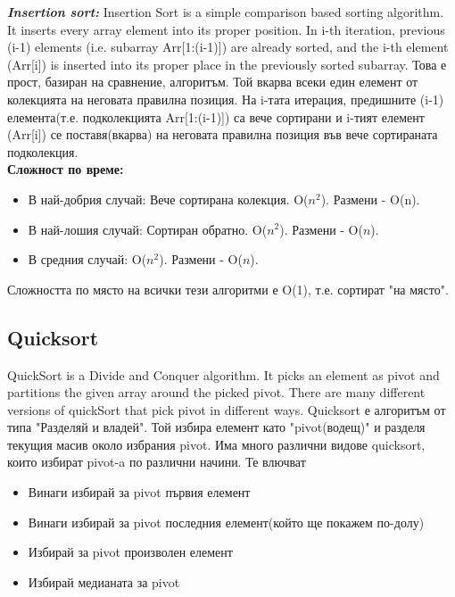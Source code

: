 \documentclass[11pt]{article} %
\newcommand{\italicBold}[1]{\textbf{\emph{#1}}}
\begin{document}
\italicBold{Insertion sort: }
Insertion Sort is a simple comparison based sorting algorithm. It inserts every array element into its proper position. In i-th iteration, previous (i-1) elements (i.e. subarray Arr[1:(i-1)]) are already sorted, and the i-th element (Arr[i]) is inserted into its proper place in the previously sorted subarray.
Това е прост, базиран на сравнение, алгоритъм. Той вкарва всеки един елемент от колекцията на неговата правилна позиция. На i-тата итерация, предишните (i-1) елемента(т.е. подколекцията Arr[1:(i-1)]) са вече сортирани и i-тият елемент (Arr[i]) се поставя(вкарва) на неговата правилна позиция във вече сортираната подколекция.
\\
\textbf{Сложност по време: }
\begin{itemize}[noitemsep]
	\item В най-добрия случай: Вече сортирана колекция. O($n^2$). Размени - O(n).
	\item В най-лошия случай: Сортиран обратно. O($n^{2}$). Размени - O($n$).
	\item В средния случай: O($n^{2}$). Размени - O($n$).\\\par
\end{itemize}

Сложността по място на всички тези алгоритми е O(1), т.е. сортират "на място".

 \subsection{Quicksort}
QuickSort is a Divide and Conquer algorithm. It picks an element as pivot and partitions the given array around the picked pivot. There are many different versions of quickSort that pick pivot in different ways.
Quicksort е алгоритъм от типа "Разделяй и владей". Той избира елемент като "pivot(водещ)" и разделя текущия масив около избрания pivot. Има много различни видове quicksort, които избират pivot-a по различни начини. Те влючват
\begin{itemize}[noitemsep]
	\item Винаги избирай за pivot първия елемент
	\item Винаги избирай за pivot последния елемент(който ще покажем по-долу)
	\item Избирай за pivot произволен елемент
	\item Избирай медианата за pivot
\end{itemize}
\end{document}
